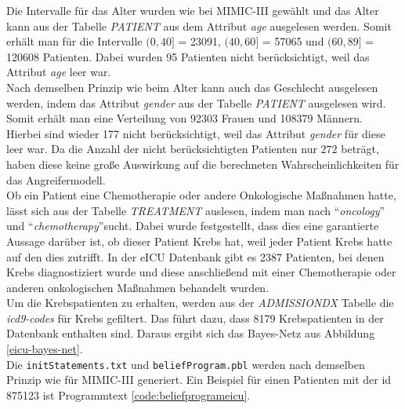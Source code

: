 \documentclass[german,version-2020-11]{uzl-thesis}
\begin{document}
Die Intervalle für das Alter wurden wie bei MIMIC-III gewählt und das Alter kann aus der Tabelle \textit{PATIENT} aus dem Attribut \textit{age} ausgelesen werden. Somit erhält man für die Intervalle  $(0,40]$ = 23091,  $(40,60]$ = 57065 und $(60,89]$ = 120608 Patienten. Dabei wurden 95 Patienten nicht berücksichtigt, weil das Attribut \textit{age} leer war.\\ 
Nach demselben Prinzip wie beim Alter kann auch das Geschlecht ausgelesen werden, indem das Attribut \textit{gender} aus der Tabelle \textit{PATIENT} ausgelesen wird. Somit erhält man eine Verteilung von 92303 Frauen und 108379 Männern. Hierbei sind wieder 177 nicht berücksichtigt, weil das Attribut \textit{gender} für diese leer war. Da die Anzahl der nicht berücksichtigten Patienten nur $272$ beträgt, haben diese keine große Auswirkung auf die berechneten Wahrscheinlichkeiten für das Angreifermodell.\\
Ob ein Patient eine Chemotherapie oder andere Onkologische Maßnahmen hatte, lässt sich aus der Tabelle \textit{TREATMENT } auslesen, indem man nach \enquote{\textit{oncology}} und  \enquote{\textit{chemotherapy}}sucht. Dabei wurde festgestellt, dass dies eine garantierte Aussage darüber ist, ob dieser Patient Krebs hat, weil jeder Patient Krebs hatte auf den dies zutrifft. In der eICU Datenbank gibt es 2387 Patienten, bei denen Krebs diagnostiziert wurde und diese anschließend mit einer Chemotherapie oder anderen onkologischen Maßnahmen behandelt wurden. \\ 
Um die  Krebspatienten zu erhalten, werden aus der \textit{ADMISSIONDX} Tabelle die \textit{icd9-codes} für Krebs gefiltert. Das führt dazu, dass 8179 Krebspatienten in der Datenbank enthalten sind. 
Daraus ergibt sich das Bayes-Netz aus Abbildung \ref{eicu-bayes-net}. \\ 
Die \texttt{initStatements.txt} und \texttt{beliefProgram.pbl} werden nach demselben Prinzip wie für MIMIC-III generiert. Ein Beispiel für einen Patienten mit der id 875123 ist Programmtext \ref{code:beliefprogrameicu}.
\end{document}
